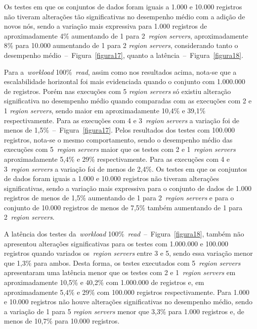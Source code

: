 \documentclass[12pt]{article}
\begin{document}
Os testes em que os conjuntos de dados foram iguais a 1.000 e 10.000 registros não tiveram alterações tão significativas no desempenho médio com a adição de novos nós, sendo a variação mais expressiva para 1.000 registros de aproximadamente 4\% aumentando de 1 para 2~\emph{region servers}, aproximadamente 8\% para 10.000 aumentando de 1 para 2 \emph{region servers}, considerando tanto o desempenho médio~--~Figura~\ref{figura17}, quanto a latência~--~Figura~\ref{figura18}.

Para a~\emph{workload} 100\%~\emph{read}, assim como nos resultados acima, nota-se que a escalabilidade horizontal foi mais evidenciada quando o conjunto com 1.000.000 de registros. 
Porém nas execuções com 5 \emph{region servers} só existiu alteração significativa no desempenho médio quando comparadas com as execuções com 2 e 1 \emph{region servers}, sendo maior em aproximadamente 10,4\% e 39,1\% respectivamente. 
Para as execuções com 4 e 3~\emph{region servers} a variação foi de menos de 1,5\%~--~Figura~\ref{figura17}. Pelos resultados dos testes com 100.000 registros, nota-se o mesmo comportamento, sendo o desempenho médio das execuções com 5~\emph{region servers} maior que os testes com 2 e 1~\emph{region servers} aproximadamente 5,4\% e 29\% respectivamente. 
Para as execuções com 4 e 3~\emph{region servers} a variação foi de menos de 2,4\%. Os testes em que os conjuntos de dados foram iguais a 1.000 e 10.000 registros não tiveram alterações significativas, sendo a variação mais expressiva para o conjunto de dados de 1.000 registros de menos de 1,5\% aumentando de 1 para 2~\emph{region servers} e para o conjunto de 10.000 registros de menos de 7,5\% também aumentando de 1 para 2~\emph{region servers}.

A latência dos testes da~\emph{workload} 100\%~\emph{read}~--~Figura~\ref{figura18}, também não apresentou alterações significativas para os testes com 1.000.000 e 100.000 registros quando variados os~\emph{region servers} entre 3 e 5, sendo essa variação menor que 1,3\% para ambos. 
Desta forma, os testes executados com 5~\emph{region servers} apresentaram uma latência menor que os testes com 2 e 1~\emph{region servers} em aproximadamente 10,5\% e 40,2\% com 1.000.000 de registros e, em aproximadamente 5,4\% e 29\% com 100.000 registros respectivamente. 
Para 1.000 e 10.000 registros não houve alterações significativas no desempenho médio, sendo a variação de 1 para 5 \emph{region servers} menor que 3,3\% para 1.000 registros e, de menos de 10,7\% para 10.000 registros.
\end{document}
